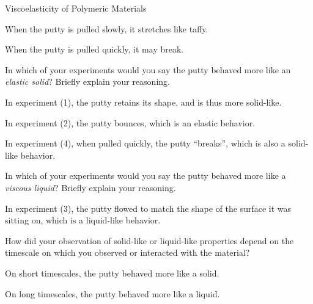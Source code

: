 \begin{activity}{Viscoelasticity of Polymeric Materials}
\begin{model}
\begin{enumerate}
\begin{itemize}
\begin{solution}[1.25in]
					When the putty is pulled slowly, it stretches like taffy.
					
					When the putty is pulled quickly, it may break.
					
				\end{solution}
			\end{itemize}
		
	\end{enumerate}

\end{model}


\begin{ctqs}

	\question In which of your experiments would you say the putty behaved more like an \emph{elastic solid}?  Briefly explain your reasoning.
	
		\begin{solution}[1.25in]
		
			In experiment (1), the putty retains its shape, and is thus more solid-like.  
			
			In experiment (2), the putty bounces, which is an elastic behavior.
			
			In experiment (4), when pulled quickly, the putty ``breaks'', which is also a solid-like behavior.
		
		\end{solution}
	
	\question In which of your experiments would you say the putty behaved more like a \emph{viscous liquid}?  Briefly explain your reasoning.
	
		\begin{solution}[1in]
		
			In experiment (3), the putty flowed to match the shape of the surface it was sitting on, which is a liquid-like behavior.
		
		\end{solution}
	
	\question How did your observation of solid-like or liquid-like properties depend on the timescale on which you observed or interacted with the material?
	
		\begin{solution}[1in]
		
			On short timescales, the putty behaved more like a solid.
			
			On long timescales, the putty behaved more like a liquid.
			
		\end{solution}
		

\end{ctqs}
\end{activity}
